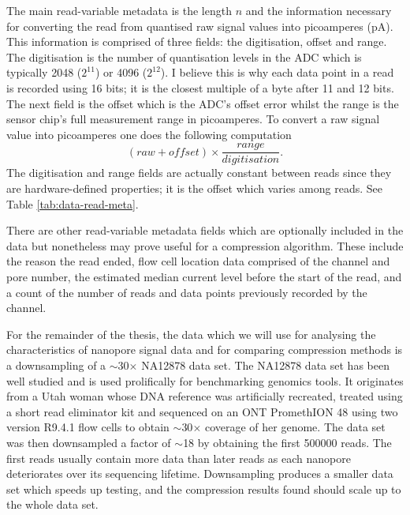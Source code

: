 The main read-variable metadata is the length $n$ and the information necessary for converting the read from quantised raw signal values into picoamperes (pA). This information is comprised of three fields: the digitisation, offset and range. The digitisation is the number of quantisation levels in the ADC which is typically 2048 ($2^{11}$) or 4096 ($2^{12}$). I believe this is why each data point in a read is recorded using 16 bits; it is the closest multiple of a byte after 11 and 12 bits. The next field is the offset which is the ADC's offset error whilst the range is the sensor chip's full measurement range in picoamperes. To convert a raw signal value into picoamperes one does the following computation
\begin{equation}(raw + offset) \times \frac{range}{digitisation}. \label{eq:pa}\end{equation}
The digitisation and range fields are actually constant between reads since they are hardware-defined properties; it is the offset which varies among reads. See Table \ref{tab:data-read-meta}.

There are other read-variable metadata fields which are optionally included in the data but nonetheless may prove useful for a compression algorithm. These include the reason the read ended, flow cell location data comprised of the channel and pore number, the estimated median current level before the start of the read, and a count of the number of reads and data points previously recorded by the channel.

For the remainder of the thesis, the data which we will use for analysing the characteristics of nanopore signal data and for comparing compression methods is a downsampling of a $\sim$30$\times$ NA12878 data set. The NA12878 data set has been well studied and is used prolifically for benchmarking genomics tools. It originates from a Utah woman whose DNA reference was artificially recreated, treated using a short read eliminator kit and sequenced on an ONT PromethION 48 using two version R9.4.1 flow cells to obtain $\sim$30$\times$ coverage of her genome.
The data set was then downsampled a factor of $\sim$18 by obtaining the first \num{500000} reads.
The first reads usually contain more data than later reads as each nanopore deteriorates over its sequencing lifetime.
Downsampling produces a smaller data set which speeds up testing, and the compression results found should scale up to the whole data set.

